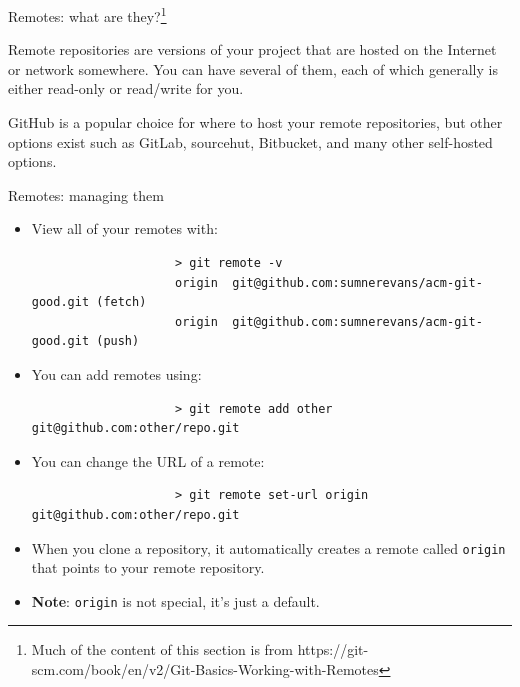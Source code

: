\documentclass{beeper}
\begin{document}
\begin{frame}{Remotes: what are they?\footnote[frame]{Much of the content of
    this section is from
    https://git-scm.com/book/en/v2/Git-Basics-Working-with-Remotes}}

    Remote repositories are versions of your project that are hosted on the
    Internet or network somewhere. You can have several of them, each of which
    generally is either read-only or read/write for you.
    \pause

    GitHub is a popular choice for where to host your remote repositories, but
    other options exist such as GitLab, sourcehut, Bitbucket, and many other
    self-hosted options.
\end{frame}

\begin{frame}[fragile]{Remotes: managing them}
    \begin{itemize}
        \item View all of your remotes with:

            {
                \footnotesize
                \begin{verbatim}
                    > git remote -v
                    origin  git@github.com:sumnerevans/acm-git-good.git (fetch)
                    origin  git@github.com:sumnerevans/acm-git-good.git (push)
                \end{verbatim}
            }
            \pause

        \item You can add remotes using:

            {
                \footnotesize
                \begin{verbatim}
                    > git remote add other git@github.com:other/repo.git
                \end{verbatim}
            }
            \pause

        \item You can change the URL of a remote:

            {
                \footnotesize
                \begin{verbatim}
                    > git remote set-url origin git@github.com:other/repo.git
                \end{verbatim}
            }
            \pause

        \item When you clone a repository, it automatically creates a remote
            called \texttt{origin} that points to your remote repository.
            \pause

        \item \textbf{Note}: \texttt{origin} is not special, it's just a
            default.
    \end{itemize}
\end{frame}
\end{document}
